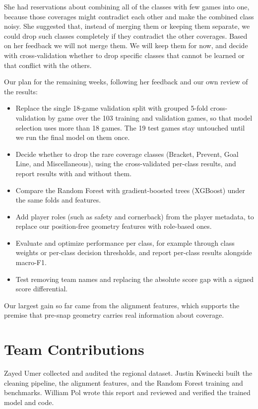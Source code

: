 \documentclass[11pt]{article}
\begin{document}
She had reservations about combining all of the classes with few games into one, because those coverages might contradict each other and make the combined class noisy. She suggested that, instead of merging them or keeping them separate, we could drop such classes completely if they contradict the other coverages. Based on her feedback we will not merge them. We will keep them for now, and decide with cross-validation whether to drop specific classes that cannot be learned or that conflict with the others.

Our plan for the remaining weeks, following her feedback and our own review of the results:
\begin{itemize}
  \item Replace the single 18-game validation split with grouped 5-fold cross-validation by game over the 103 training and validation games, so that model selection uses more than 18 games. The 19 test games stay untouched until we run the final model on them once.
  \item Decide whether to drop the rare coverage classes (Bracket, Prevent, Goal Line, and Miscellaneous), using the cross-validated per-class results, and report results with and without them.
  \item Compare the Random Forest with gradient-boosted trees (XGBoost) under the same folds and features.
  \item Add player roles (such as safety and cornerback) from the player metadata, to replace our position-free geometry features with role-based ones.
  \item Evaluate and optimize performance per class, for example through class weights or per-class decision thresholds, and report per-class results alongside macro-F1.
  \item Test removing team names and replacing the absolute score gap with a signed score differential.
\end{itemize}
Our largest gain so far came from the alignment features, which supports the premise that pre-snap geometry carries real information about coverage.

\section*{Team Contributions}

Zayed Umer collected and audited the regional dataset. Justin Kwinecki built the cleaning pipeline, the alignment features, and the Random Forest training and benchmarks. William Pol wrote this report and reviewed and verified the trained model and code.


\end{document}
